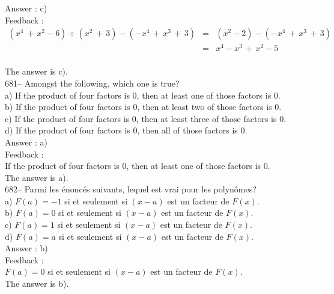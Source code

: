 \documentclass[letterpaper, 12pt]{article}
\begin{document}
Answer : c)\\

Feedback :\\
\begin{eqnarray*}
\left( x^{4}\,+\,x^{2}-6\right) \div\left( x^{2}\,+\,3\right) -\left(
-x^{4}\,+\,x^{3}\,+\,3\right)&=&\left( x^{2}-2\right)-\left(
-x^{4}\,+\,x^{3}\,+\,3\right)\\[1mm]
&=&x^{4}-x^{3}\,+\,x^{2}-5\\[1mm]
\end{eqnarray*}

The answer is c).\\

681-- Amongst the following, which one is true?\\
a) If the product of four factors is 0, then at least one of those factors is 0.  \\
b) If the product of four factors is 0, then at least two of those factors is 0. \\
c) If the product of four factors is 0, then at least three of those factors is 0. \\
d) If the product of four factors is 0, then all of those factors is 0.\\

Answer : a)\\

Feedback : \\
If the product of four factors is 0, then at least one of those factors is 0. \\
The answer is a).\\

682-- Parmi les \'enonc\'es suivants, lequel est vrai pour les polyn\^omes?\\
a)  $F\left( a\right) = -1$ si et seulement si $\left( x-a\right) $
est un
facteur de $F\left( x\right) $.\\
b) $ F\left( a\right) = 0 $ si et seulement si $ \left( x-a\right) $
est un facteur
de $F\left( x\right) $.\\
c) $ F\left( a\right) = 1 $ si et seulement si $ \left( x-a\right) $
est un facteur
de $F\left( x\right) $.\\
d) $ F\left( a\right) = a $ si et seulement si $ \left( x-a\right) $
est un facteur
de $F\left( x\right) $.\\

Answer : b)\\

Feedback : \\
$ F\left( a\right) = 0 $ si et seulement si $ \left( x-a\right) $
est un facteur de
$F\left( x\right) $.\\
The answer is b).\\
\end{document}
